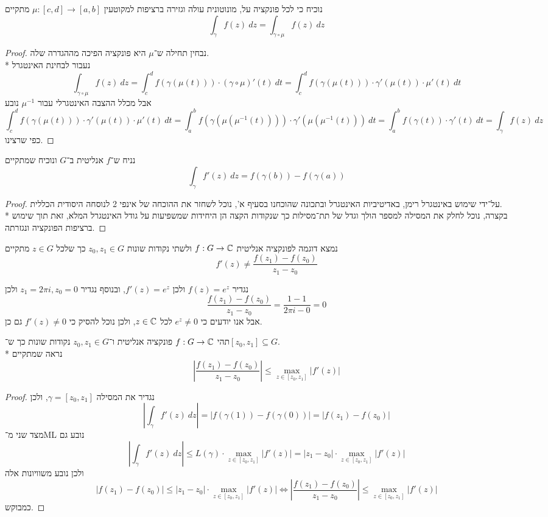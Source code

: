 \subquestion{}
נוכיח כי לכל פונקציה על, מונוטונית עולה וגזירה ברציפות למקוטעין $\mu : [c, d] \to [a, b]$ מתקיים
\[
	\int_\gamma f(z)\ dz
	= \int_{\gamma \circ \mu} f(z)\ dz
\]
\begin{proof}
	נבחין תחילה ש־$\mu$ היא פונקציה הפיכה מההגדרה שלה. \\*
	נעבור לבחינת האינטגרל
	\[
		\int_{\gamma \circ \mu} f(z)\ dz
		= \int_c^d f(\gamma(\mu(t))) \cdot (\gamma \circ \mu)'(t)\ dt
		= \int_c^d f(\gamma(\mu(t))) \cdot \gamma'(\mu(t)) \cdot \mu'(t)\ dt
	\]
	אבל מכלל ההצבה האינטגרלי עבור $\mu^{-1}$ נובע
	\[
		\int_c^d f(\gamma(\mu(t))) \cdot \gamma'(\mu(t)) \cdot \mu'(t)\ dt
		= \int_a^b f(\gamma(\mu(\mu^{-1}(t)))) \cdot \gamma'(\mu(\mu^{-1}(t)))\ dt
		= \int_a^b f(\gamma(t)) \cdot \gamma'(t)\ dt
		= \int_\gamma f(z)\ dz
	\]
	כפי שרצינו.
\end{proof}

\subquestion{}
נניח ש־$f$ אנליטית ב־$G$ ונוכיח שמתקיים
\[
	\int_\gamma f'(z)\ dz
	= f(\gamma(b)) - f(\gamma(a))
\]
\begin{proof}
	על־ידי שימוש באינטגרל רימן, באדיטיביות האינטגרל ובתכונה שהוכחנו בסעיף א', נוכל לשחזר את ההוכחה של אינפי 2 לנוסחה היסודית הכללית. \\*
	בקצרה, נוכל לחלק את המסילה למספר הולך וגדל של תת־מסילות כך שנקודות הקצה הן היחידות שמשפיעות על גודל האינטגרל המלא, זאת תוך שימוש ברציפות הפונקציה ונגזרתה.
\end{proof}

\question{}
\subquestion{}
נמצא דוגמה לפונקציה אנליטית $f : G \to \mathbb{C}$ ולשתי נקודות שונות $z_0, z_1 \in G$ כך שלכל $z \in G$ מתקיים
\[
	f'(z) \ne \frac{f(z_1) - f(z_0)}{z_1 - z_0}
\]
\begin{solution}
	נגדיר $f(z) = e^z$ ולכן $f'(z) = e^z$, ובנוסף נגדיר $z_1 = 2\pi i, z_0 = 0$ ולכן
	\[
		\frac{f(z_1) - f(z_0)}{z_1 - z_0} = \frac{1 - 1}{2\pi i - 0} = 0
	\]
	אבל אנו יודעים כי $e^z \ne 0$ לכל $z \in \mathbb{C}$, ולכן נוכל להסיק כי $f'(z) \ne 0$ גם כן.
\end{solution}

\subquestion{}
תהי $f : G \to \mathbb{C}$ פונקציה אנליטית ו־$z_0, z_1 \in G$ נקודות שונות כך ש־$[z_0, z_1] \subseteq G$. \\*
נראה שמתקיים
\[
	\left\lvert \frac{f(z_1) - f(z_0)}{z_1 - z_0} \right\rvert \le \max_{z \in [z_0, z_1]} |f'(z)|
\]
\begin{proof}
	נגדיר את המסילה $\gamma = [z_0, z_1]$, ולכן
	\[
		\left\lvert \int_\gamma f'(z)\ dz \right\rvert
		= |f(\gamma(1)) - f(\gamma(0))|
		= |f(z_1) - f(z_0)|
	\]
	מצד שני מ־ML נובע גם
	\[
		\left\lvert \int_\gamma f'(z)\ dz \right\rvert
		\le L(\gamma) \cdot \max_{z \in [z_0, z_1]} |f'(z)|
		= |z_1 - z_0| \cdot \max_{z \in [z_0, z_1]} |f'(z)|
	\]
	ולכן נובע משוויונות אלה
	\[
		|f(z_1) - f(z_0)|
		\le |z_1 - z_0| \cdot \max_{z \in [z_0, z_1]} |f'(z)|
		\iff
		\left\lvert \frac{f(z_1) - f(z_0)}{z_1 - z_0} \right\rvert \le \max_{z \in [z_0, z_1]} |f'(z)|
	\]
	כמבוקש.
\end{proof}

